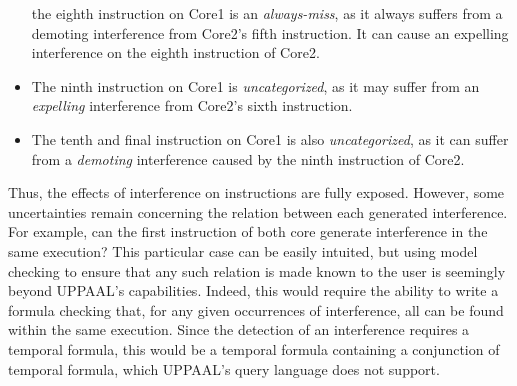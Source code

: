 \begin{example}
\begin{itemize}
   the eighth instruction on Core1 is an \textit{always-miss}, as it always
   suffers from a demoting interference from Core2's fifth instruction.
   It can cause an expelling interference on the eighth instruction of Core2.
\item
   The ninth instruction on Core1 is \textit{uncategorized}, as it may suffer
   from an \textit{expelling} interference from Core2's sixth instruction.
\item
   The tenth and final instruction on Core1 is also \textit{uncategorized},
   as it can suffer from a \textit{demoting} interference caused by the ninth
   instruction of Core2.
\end{itemize}
\end{example}
Thus, the effects of interference on instructions are fully exposed. However,
some uncertainties remain concerning the relation between each generated
interference. For example, can the first instruction of both core generate
interference in the same execution? This particular case can be easily
intuited, but using model checking to ensure that any such relation is made
known to the user is seemingly beyond UPPAAL's capabilities. Indeed, this would
require the ability to write a formula checking that, for any given
occurrences of interference, all can be found within the same execution. Since
the detection of an interference requires a temporal formula, this would be
a temporal formula containing a conjunction of temporal formula, which UPPAAL's
query language does not support.
